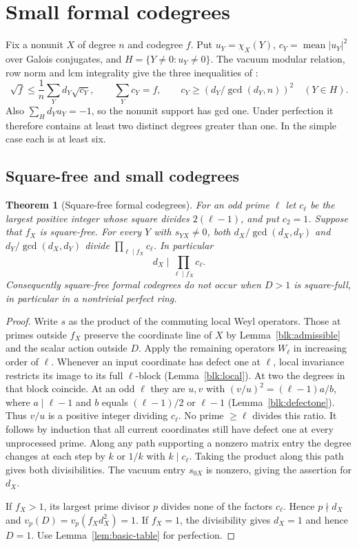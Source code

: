 \documentclass[11pt]{amsart}
\numberwithin{equation}{section}
\newtheorem{theorem}{Theorem}[section]
\theoremstyle{definition}
\theoremstyle{plain}
\begin{document}
\section{Small formal codegrees}\label{sec:small}
Fix a nonunit $X$ of degree $n$ and codegree $f$. Put $u_Y=\chi_X(Y)$,
$c_Y=\operatorname{mean}|u_Y|^2$ over Galois conjugates, and
$H=\{Y\ne0:u_Y\ne0\}$. The vacuum modular relation, row norm and lcm integrality give the
three inequalities of \cite[\S20, (20.1) and the next sentence]{BDPcore}:
\begin{equation}\label{st}
 \sqrt f\le\frac1n\sum_Yd_Y\sqrt{c_Y},\qquad
 \sum_Y c_Y=f,\qquad c_Y\ge(d_Y/\gcd(d_Y,n))^2\quad(Y\in H).
\end{equation}
Also $\sum_{H}d_Yu_Y=-1$, so the nonunit support has gcd one.
Under perfection it therefore contains at least two distinct degrees
greater than one. In the simple case each is at least six.

\subsection{Square-free and small codegrees}
\begin{theorem}[Square-free formal codegrees]\label{thm:squarefree-codegree}
For an odd prime $\ell$ let $c_\ell$ be the largest positive integer whose
square divides $2(\ell-1)$, and put $c_2=1$.
Suppose that $f_X$ is square-free. For every $Y$ with $s_{YX}\ne0$, both
$d_X/\gcd(d_X,d_Y)$ and $d_Y/\gcd(d_X,d_Y)$ divide
$\prod_{\ell\mid f_X}c_\ell$. In particular
\[
                         d_X\mid\prod_{\ell\mid f_X}c_\ell .
\]
Consequently square-free formal codegrees do not occur when $D>1$ is
square-full, in particular in a nontrivial perfect ring.
\end{theorem}
\begin{proof}
Write $s$ as the product of the commuting local Weyl operators.
Those at primes outside $f_X$ preserve the coordinate line of $X$
by Lemma~\ref{blk:admissible} and the scalar action outside $D$.
Apply the remaining operators $W_\ell$ in increasing order of $\ell$.
Whenever an input coordinate has defect one at $\ell$, local invariance
restricts its image to its full $\ell$-block (Lemma~\ref{blk:local}).
At two the degrees in that block coincide. At an odd $\ell$ they are
$u,v$ with $(v/u)^2=(\ell-1)a/b$, where $a\mid\ell-1$ and
$b$ equals $(\ell-1)/2$ or $\ell-1$ (Lemma~\ref{blk:defectone}).
Thus $v/u$ is a positive integer dividing $c_\ell$. No prime
$\ge\ell$ divides this ratio. It follows by induction that all current
coordinates still have defect one at every unprocessed prime.
Along any path supporting a nonzero matrix entry the degree changes
at each step by $k$ or $1/k$ with $k\mid c_\ell$. Taking the product along this path gives both divisibilities. The vacuum entry $s_{0X}$ is nonzero, giving the
assertion for $d_X$.

If $f_X>1$, its largest prime divisor $p$ divides none of the factors
$c_\ell$. Hence $p\nmid d_X$ and $v_p(D)=v_p(f_Xd_X^2)=1$.
If $f_X=1$, the divisibility gives $d_X=1$ and hence $D=1$.
Use Lemma~\ref{lem:basic-table} for perfection.
\end{proof}
\end{document}
